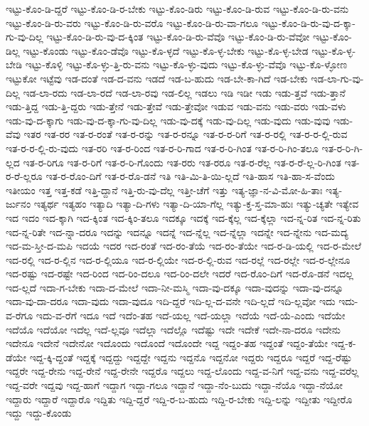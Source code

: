 {ಇಟ್ಟು-ಕೊಂ-ಡಿ-ದ್ದರೆ
ಇಟ್ಟು-ಕೊಂ-ಡಿ-ರ-ಬೇಕು
ಇಟ್ಟು-ಕೊಂ-ಡಿರು
ಇಟ್ಟು-ಕೊಂ-ಡಿ-ರುವ
ಇಟ್ಟು-ಕೊಂ-ಡಿ-ರು-ವನು
ಇಟ್ಟು-ಕೊಂ-ಡಿ-ರು-ವರು
ಇಟ್ಟು-ಕೊಂ-ಡಿ-ರು-ವರೊ
ಇಟ್ಟು-ಕೊಂ-ಡಿ-ರು-ವಾ-ಗಲೂ
ಇಟ್ಟು-ಕೊಂ-ಡಿ-ರು-ವು-ದ-ಕ್ಕಾ-ಗು-ವು-ದಿಲ್ಲ
ಇಟ್ಟು-ಕೊಂ-ಡಿ-ರು-ವು-ದ-ಕ್ಕಿಂತ
ಇಟ್ಟು-ಕೊಂ-ಡಿ-ರು-ವೆವೊ
ಇಟ್ಟು-ಕೊಂ-ಡಿ-ರು-ವೆವೋ
ಇಟ್ಟು-ಕೊಂ-ಡಿಲ್ಲ
ಇಟ್ಟು-ಕೊಂಡು
ಇಟ್ಟು-ಕೊಂ-ಡೆವೊ
ಇಟ್ಟು-ಕೊ-ಳ್ಳದೆ
ಇಟ್ಟು-ಕೊ-ಳ್ಳ-ಬೇಕು
ಇಟ್ಟು-ಕೊ-ಳ್ಳ-ಬೇಡ
ಇಟ್ಟು-ಕೊ-ಳ್ಳ-ಬೇಡಿ
ಇಟ್ಟು-ಕೊಳ್ಳಿ
ಇಟ್ಟು-ಕೊ-ಳ್ಳು-ತ್ತಿ-ರು-ವನು
ಇಟ್ಟು-ಕೊ-ಳ್ಳು-ವುದು
ಇಟ್ಟು-ಕೊ-ಳ್ಳು-ವೆವೊ
ಇಟ್ಟು-ಕೊ-ಳ್ಳೋಣ
ಇಟ್ಟುಕೋ
ಇಟ್ಟೆವು
ಇಡ-ದಂತೆ
ಇಡ-ದ-ವನು
ಇಡದೆ
ಇಡ-ಬ-ಹುದು
ಇಡ-ಬೇ-ಕಾ-ಗಿದೆ
ಇಡ-ಬೇಕು
ಇಡ-ಲಾ-ಗು-ವು-ದಿಲ್ಲ
ಇಡ-ಲಾ-ರದು
ಇಡ-ಲಾ-ರದೆ
ಇಡ-ಲಾ-ರವು
ಇಡ-ಲಿಲ್ಲ
ಇಡಲು
ಇಡಿ
ಇಡೀ
ಇಡು
ಇಡು-ತ್ತವೆ
ಇಡು-ತ್ತಾನೆ
ಇಡು-ತ್ತಿದ್ದ
ಇಡು-ತ್ತಿ-ದ್ದರು
ಇಡು-ತ್ತೇನೆ
ಇಡು-ತ್ತೇವೆ
ಇಡು-ತ್ತೇವೋ
ಇಡುವ
ಇಡು-ವನು
ಇಡು-ವರು
ಇಡು-ವಳು
ಇಡು-ವು-ದ-ಕ್ಕಾಗು
ಇಡು-ವು-ದ-ಕ್ಕಾ-ಗು-ವು-ದಿಲ್ಲ
ಇಡು-ವು-ದಕ್ಕೆ
ಇಡು-ವು-ದಿಲ್ಲ
ಇಡು-ವುದು
ಇಡು-ವುವು
ಇಡು-ವೆವು
ಇತರ
ಇತ-ರರ
ಇತ-ರ-ರಂತೆ
ಇತ-ರ-ರನ್ನು
ಇತ-ರ-ರನ್ನೂ
ಇತ-ರ-ರ-ರಿಗೆ
ಇತ-ರ-ರಲ್ಲಿ
ಇತ-ರ-ರ-ಲ್ಲಿ-ರುವ
ಇತ-ರ-ರ-ಲ್ಲಿ-ರು-ವುದು
ಇತ-ರರಿ
ಇತ-ರ-ರಿಂದ
ಇತ-ರ-ರಿ-ಗಾದ
ಇತ-ರ-ರಿ-ಗಿಂತ
ಇತ-ರ-ರಿ-ಗಿಂ-ತಲೂ
ಇತ-ರ-ರಿ-ಗಿ-ಲ್ಲದ
ಇತ-ರ-ರಿಗೂ
ಇತ-ರ-ರಿಗೆ
ಇತ-ರ-ರಿ-ಗೊಂದು
ಇತ-ರರು
ಇತ-ರರೂ
ಇತ-ರ-ರೆಲ್ಲ
ಇತ-ರ-ರೆ-ಲ್ಲ-ರಿ-ಗಿಂತ
ಇತ-ರ-ರೆ-ಲ್ಲರೂ
ಇತ-ರ-ರೊಂ-ದಿಗೆ
ಇತ-ರ-ರೊ-ಡನೆ
ಇತಿ
ಇತಿ-ಮಿ-ತಿ-ಯಿ-ಲ್ಲದೆ
ಇತಿ-ಹಾಸ
ಇತಿ-ಹಾ-ಸ-ವೆಂದು
ಇತೀಯಂ
ಇತ್ತ
ಇತ್ತ-ಕಡೆ
ಇತ್ತಿ-ದ್ದಾನೆ
ಇತ್ತಿ-ರು-ವು-ದೆಲ್ಲ
ಇತ್ತೀ-ಚೆಗೆ
ಇತ್ತು
ಇತ್ಯ-ಜ್ಞಾ-ನ-ವಿ-ಮೋ-ಹಿ-ತಾಃ
ಇತ್ಯ-ರ್ಜುನಂ
ಇತ್ಯರ್ಥ
ಇತ್ಯಹಂ
ಇತ್ಯಾದಿ
ಇತ್ಯಾ-ದಿ-ಗಳು
ಇತ್ಯಾ-ದಿ-ಯಾ-ಗೆಲ್ಲ
ಇತ್ಯು-ಕ್ತ-ಸ್ತ-ಮಾ-ಹುಃ
ಇತ್ಯು-ಚ್ಯತೇ
ಇತ್ಯೇವ
ಇದ
ಇದಂ
ಇದ-ಕ್ಕಾಗಿ
ಇದ-ಕ್ಕಿಂತ
ಇದ-ಕ್ಕಿಂ-ತಲೂ
ಇದಕ್ಕೂ
ಇದಕ್ಕೆ
ಇದ-ಕ್ಕೆಲ್ಲ
ಇದ-ಕ್ಕೆಲ್ಲಾ
ಇದ-ನ್ನ-ರಿತ
ಇದ-ನ್ನ-ರಿತು
ಇದ-ನ್ನ-ರಿತೇ
ಇದ-ನ್ನಾ-ದರೂ
ಇದನ್ನು
ಇದನ್ನೂ
ಇದನ್ನೆ
ಇದ-ನ್ನೆಲ್ಲ
ಇದ-ನ್ನೆಲ್ಲಾ
ಇದನ್ನೇ
ಇದ-ನ್ನೇನು
ಇದ-ಮದ್ಯ
ಇದ-ಮ-ಸ್ತೀ-ದ-ಮಪಿ
ಇದಯೆ
ಇದರ
ಇದ-ರಂತೆ
ಇದ-ರಂ-ತೆಯೆ
ಇದ-ರಂ-ತೆಯೇ
ಇದ-ರ-ಡಿ-ಯಲ್ಲಿ
ಇದ-ರ-ಮೇಲೆ
ಇದ-ರಲ್ಲಿ
ಇದ-ರ-ಲ್ಲಿನ
ಇದ-ರ-ಲ್ಲಿಯೂ
ಇದ-ರ-ಲ್ಲಿಯೇ
ಇದ-ರ-ಲ್ಲಿ-ರುವ
ಇದ-ರಲ್ಲೆ
ಇದ-ರಲ್ಲೇ
ಇದ-ರ-ಲ್ಲೇನೂ
ಇದ-ರಷ್ಟು
ಇದ-ರಷ್ಟೇ
ಇದ-ರಿಂದ
ಇದ-ರಿಂ-ದಲೂ
ಇದ-ರಿಂ-ದಲೇ
ಇದರೆ
ಇದ-ರೊಂ-ದಿಗೆ
ಇದ-ರೊ-ಡನೆ
ಇದಲ್ಲ
ಇದ-ಲ್ಲದೆ
ಇದಾ-ಗ-ಬೇಕು
ಇದಾ-ದ-ಮೇಲೆ
ಇದಾ-ನೀ-ಮಸ್ಮಿ
ಇದಾ-ವು-ದಕ್ಕೂ
ಇದಾ-ವುದನ್ನು
ಇದಾ-ವು-ದನ್ನೂ
ಇದಾ-ವು-ದಾ-ದರೂ
ಇದಾ-ವುದು
ಇದಾ-ವುದೂ
ಇದಿ-ದ್ದರೆ
ಇದಿ-ಲ್ಲ-ದ-ವನೇ
ಇದಿ-ಲ್ಲದೆ
ಇದಿ-ಲ್ಲವೋ
ಇದು
ಇದು-ವ-ರೆಗೂ
ಇದು-ವ-ರೆಗೆ
ಇದೂ
ಇದೆ
ಇದೆಂ-ತಹ
ಇದೆ-ಯಲ್ಲ
ಇದೆ-ಯಲ್ಲಾ
ಇದೆಯೆ
ಇದೆ-ಯೆ-ಎಂದು
ಇದೆಯೇ
ಇದೆಯೊ
ಇದೆಯೋ
ಇದೆಲ್ಲ
ಇದೆ-ಲ್ಲವೂ
ಇದೆಲ್ಲಾ
ಇದೆಲ್ಲೊ
ಇದೆಷ್ಟು
ಇದೇ
ಇದೇಕೆ
ಇದೇ-ನಾ-ದರೂ
ಇದೇನು
ಇದೇನೂ
ಇದೇನೆ
ಇದೇನೋ
ಇದೊಂದು
ಇದೊಂದೆ
ಇದೊಂದೇ
ಇದ್ದ
ಇದ್ದಂ-ತಹ
ಇದ್ದಂತೆ
ಇದ್ದಂ-ತೆಯೇ
ಇದ್ದ-ಕ-ಡೆಯೇ
ಇದ್ದ-ಕ್ಕಿ-ದ್ದಂತೆ
ಇದ್ದಕ್ಕೆ
ಇದ್ದದ್ದು
ಇದ್ದದ್ದೇ
ಇದ್ದನು
ಇದ್ದನೊ
ಇದ್ದನೋ
ಇದ್ದರು
ಇದ್ದರೂ
ಇದ್ದರೆ
ಇದ್ದ-ರೆಷ್ಟು
ಇದ್ದರೇ
ಇದ್ದ-ರೇನು
ಇದ್ದ-ರೇನೆ
ಇದ್ದ-ರೇನೇ
ಇದ್ದರೊ
ಇದ್ದಲು
ಇದ್ದ-ಲೊಂದು
ಇದ್ದ-ವ-ನಿಗೆ
ಇದ್ದ-ವನು
ಇದ್ದ-ವರೆಲ್ಲ
ಇದ್ದ-ವರೇ
ಇದ್ದವು
ಇದ್ದ-ಹಾಗೆ
ಇದ್ದಾಗ
ಇದ್ದಾ-ಗಲೂ
ಇದ್ದಾನೆ
ಇದ್ದಾ-ನೆಂ-ಬುದು
ಇದ್ದಾ-ನೆಯೊ
ಇದ್ದಾ-ನೆಯೋ
ಇದ್ದಾರು
ಇದ್ದಾರೆ
ಇದ್ದಾರೊ
ಇದ್ದಿತು
ಇದ್ದಿ-ದ್ದರೆ
ಇದ್ದಿ-ರ-ಬ-ಹುದು
ಇದ್ದಿ-ರ-ಬೇಕು
ಇದ್ದಿ-ಲನ್ನು
ಇದ್ದೀತು
ಇದ್ದೀರೊ
ಇದ್ದು
ಇದ್ದು-ಕೊಂಡು
}
